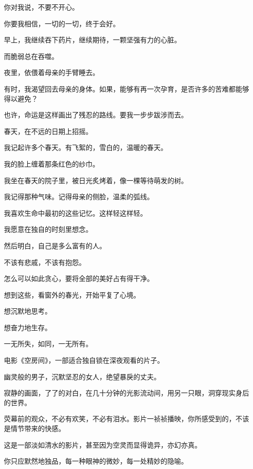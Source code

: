 		你对我说，不要不开心。\par
		你要我相信，一切的一切，终于会好。\par
		早上，我继续吞下药片，继续期待，一颗坚强有力的心脏。\par
		而脆弱总在吞噬。\par
		夜里，依偎着母亲的手臂睡去。\par
		有时，我渴望回去母亲的身体。如果，能够有再一次孕育，是否许多的苦难都能够得以避免？\par
		也许，命运是这样画出了残忍的路线。要我一步步跋涉而去。\par
		春天，在不远的日期上招摇。\par
		我记起许多个春天。有飞絮的，雪白的，温暖的春天。\par
		我的脸上缠着那条红色的纱巾。\par
		我坐在春天的院子里，被日光炙烤着，像一棵等待萌发的树。\par
		我记得那种气味。记得母亲的侧脸，温柔的弧线。\par
		我喜欢生命中最初的这些记忆。这样轻这样轻。\par
		我愿意在独自的时刻里想念。\par
		然后明白，自己是多么富有的人。\par
		不该有悲戚，不该有抱怨。\par
		怎么可以如此贪心，要将全部的美好占有得干净。\par
		想到这些，看窗外的春光，开始平复了心境。\par
		想沉默地思考。\par
		想奋力地生存。

	\endwriting



		一无所失，如同，一无所有。


		\vspace{1em}
		电影《空房间》，一部适合独自锁在深夜观看的片子。\par
		幽灵般的男子，沉默坚忍的女人，绝望暴戾的丈夫。\par
		寂静的画面，了了的对白，在几十分钟的光影流动间，用另一只眼，洞穿现实身后的世界。\par
		荧幕前的观众，不必有欢笑，不必有泪水。影片一祯祯播映，你所感受到的，不该是情节带来的快感。\par
		这是一部淡如清水的影片，甚至因为空灵而显得诡异，亦幻亦真。\par
		你只应默然地独品，每一种眼神的微妙，每一处精妙的隐喻。

